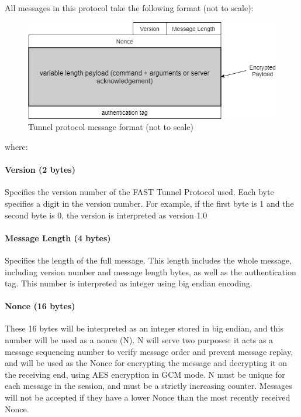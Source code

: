 \documentclass[12pt]{article}
\begin{document}
All messages in this protocol take the following format (not to scale):

\begin{figure}[h]
    \centering
    \includegraphics[width=\textwidth]{Message_Format}
    \caption{Tunnel protocol message format (not to scale)}
    \label{fig:tunnel_msc}
\end{figure}

\noindent where:

\paragraph{Version (2 bytes)}
Specifies the version number of the FAST Tunnel Protocol used. Each byte specifies a digit in the version number. For example, if the first byte is 1 and the second byte is 0, the version is interpreted as version 1.0

\paragraph{Message Length (4 bytes)}
Specifies the length of the full message. This length includes the whole message, including version number and message length bytes, as well as the authentication tag. This number is interpreted as integer using big endian encoding.

\paragraph{Nonce (16 bytes)}
These 16 bytes will be interpreted as an integer stored in big endian, and this number will be used as a nonce (N). N will serve two purposes: it acts as a message sequencing number to verify message order and prevent message replay, and will be used as the Nonce for encrypting the message and decrypting it on the receiving end, using AES encryption in GCM mode. N must be unique for each message in the session, and must be a strictly increasing counter. Messages will not be accepted if they have a lower Nonce than the most recently received Nonce.
\end{document}
